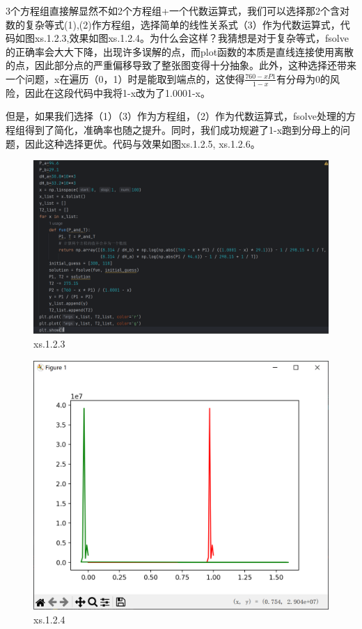 \documentclass[12pt]{article}
\begin{document}
3个方程组直接解显然不如2个方程组+一个代数运算式，我们可以选择那2个含对数的复杂等式(1),(2)作方程组，选择简单的线性关系式（3）作为代数运算式，代码如图xs.1.2.3,效果如图xs.1.2.4。为什么会这样？我猜想是对于复杂等式，fsolve的正确率会大大下降，出现许多误解的点，而plot函数的本质是直线连接使用离散的点，因此部分点的严重偏移导致了整张图变得十分抽象。此外，这种选择还带来一个问题，x在遍历（0，1）时是能取到端点的，这使得\(\frac{760-xP1}{1-x}\)有分母为0的风险，因此在这段代码中我将1-x改为了1.0001-x。

但是，如果我们选择（1）（3）作为方程组，（2）作为代数运算式，fsolve处理的方程组得到了简化，准确率也随之提升。同时，我们成功规避了1-x跑到分母上的问题，因此这种选择更优。代码与效果如图xs.1.2.5, xs.1.2.6。
\begin{figure}[H]
    \centering
    \includegraphics[width=1\linewidth]{解方程 program5.png}
    \caption{xs.1.2.3}
    \label{fig:enter-label}
\end{figure}

\begin{figure}[H]
    \centering
    \includegraphics[width=0.75\linewidth]{解方程 Pic2.png}
    \caption{xs.1.2.4}
    \label{fig:enter-label}
\end{figure}
\end{document}
